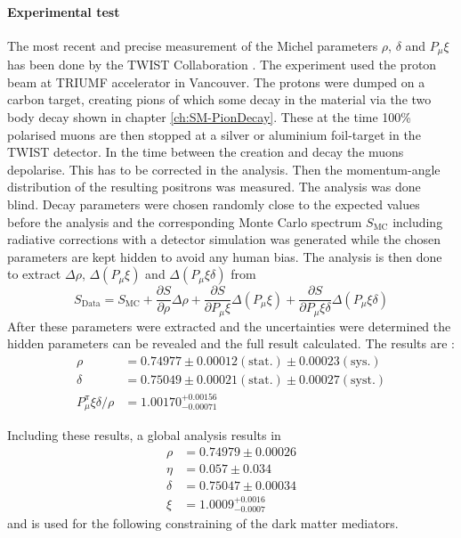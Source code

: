 \paragraph{Experimental test}
The most recent and precise measurement of the Michel parameters $\rho$, $\delta$ and $P_\mu\xi$ has been done by the TWIST Collaboration \cite{TWIST:2011aa}. The experiment used the proton beam at TRIUMF accelerator in Vancouver. The protons were dumped on a carbon target, creating pions of which some decay in the material via the two body decay shown in chapter \ref{ch:SM-PionDecay}. These at the time 100\% polarised muons are then stopped at a silver or aluminium foil-target in the TWIST detector. In the time between the creation and decay the muons depolarise. This has to be corrected in the analysis. Then the momentum-angle distribution of the resulting positrons was measured. The analysis was done blind. Decay parameters were chosen randomly close to the expected values before the analysis and the corresponding Monte Carlo spectrum $S_\text{MC}$ including radiative corrections with a detector simulation was generated while the chosen parameters are kept hidden to avoid any human bias. The analysis is then done to extract $\Delta\rho$, $\Delta (P_\mu \xi)$ and $\Delta( P_\mu\xi\delta)$ from
\begin{equation}
S_\text{Data}=S_\text{MC}+\frac{\partial S}{\partial\rho}\Delta \rho+\frac{\partial S}{\partial P_\mu\xi}\Delta(P_\mu\xi)+\frac{\partial S}{\partial P_\mu \xi \delta}\Delta(P_\mu\xi\delta)
\end{equation}
After these parameters were extracted and the uncertainties were determined the hidden parameters can be revealed and the full result calculated. 
The results are :
\begin{align*}
\rho &= 0.74977\pm0.00012(\text{stat.})\pm 0.00023(\text{sys.})\\
\delta &=0.75049\pm0.00021(\text{stat.})\pm 0.00027(\text{syst.})\\
P^\pi_\mu\xi\delta/\rho&=1.00170^{+0.00156}_{-0.00071}
\end{align*}

Including these results, a global analysis results in 
\begin{align*}
\rho &=0.74979 \pm 0.00026\\
\eta &=0.057 \pm 0.034\\
\delta &= 0.75047\pm 0.00034\\
\xi &= 1.0009^{+0.0016}_{-0.0007}
\end{align*}
and is used for the following constraining of the dark matter mediators.